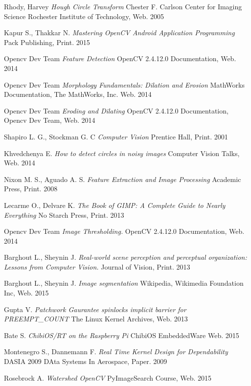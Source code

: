 \documentclass[12pt,twoside,a4paper]{article}
\begin{document}
\begin{thebibliography}{1}
Rhody, Harvey
\textit{Hough Circle Transform} Chester F. Carlson Center for Imaging Science Rochester Institute of Technology, Web. 2005

Kapur S., Thakkar N.
\textit{Mastering OpenCV Android Application Programming} Pack Publishing, Print. 2015

Opencv Dev Team
\textit{Feature Detection} OpenCV 2.4.12.0 Documentation, Web. 2014

Opencv Dev Team
\textit{Morphology Fundamentals: Dilation and Erosion} MathWorks Documentation, The MathWorks, Inc. Web. 2014

Opencv Dev Team
\textit{Eroding and Dilating} OpenCV 2.4.12.0 Documentation, Opencv Dev Team, Web. 2014

Shapiro L. G., Stockman G. C
\textit{Computer Vision} Prentice Hall, Print. 2001

Khvedchenya E.
\textit{How to detect circles in noisy images} Computer Vision Talks, Web. 2014

Nixon M. S., Aguado A. S.
\textit{Feature Extraction and Image Processing} Academic Press, Print. 2008

Lecarme  O., Delvare K.
\textit{The Book of GIMP: A Complete Guide to Nearly Everything} No Starch Press, Print. 2013

Opencv Dev Team
\textit{Image Thresholding.} OpenCV 2.4.12.0 Documentation, Web. 2014

Barghout L., Sheynin J.
\textit{Real-world scene perception and perceptual organization: Lessons from Computer Vision.} Journal of Vision, Print. 2013

Barghout L., Sheynin J.
\textit{Image segmentation} Wikipedia, Wikimedia Foundation Inc, Web. 2015

Gupta V.
\textit{Patchwork Gaurantee spinlocks implicit barrier for PREEMPT\_COUNT} The Linux Kernel Archives, Web. 2013

Bate S.
\textit{ChibiOS/RT on the Raspberry Pi} ChibiOS EmbeddedWare Web. 2015

Montenegro S., Dannemann F. 
\textit{Real Time Kernel Design for Dependability} DASIA 2009 DAta Systems In Aerospace, Paper. 2009

Rosebrock A.
\textit{Watershed OpenCV} PyImageSearch Course, Web. 2015

\end{thebibliography}
\end{document}
